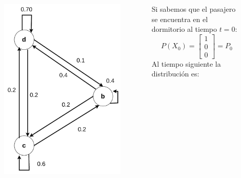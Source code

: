 \documentclass[11pt]{beamer}
\begin{document}
\begin{frame}\small
	\begin{columns}
		\begin{column}{0.5\textwidth}
			\vspace{-0.5cm}
			\begin{figure}
				\includegraphics[scale=0.5]{images/markov_cuatro.pdf}
			\end{figure}
		\end{column}
		\begin{column}{0.5\textwidth}
			Si sabemos que el pasajero se encuentra en el dormitorio al tiempo $t = 0$:
			\[P(X_0)= \begin{bmatrix}
						1 \\
						0 \\
						0
					  \end{bmatrix}
						=P_0\]
			Al tiempo siguiente la distribución es:
			

\end{column}
\end{columns}
\end{frame}
\end{document}
